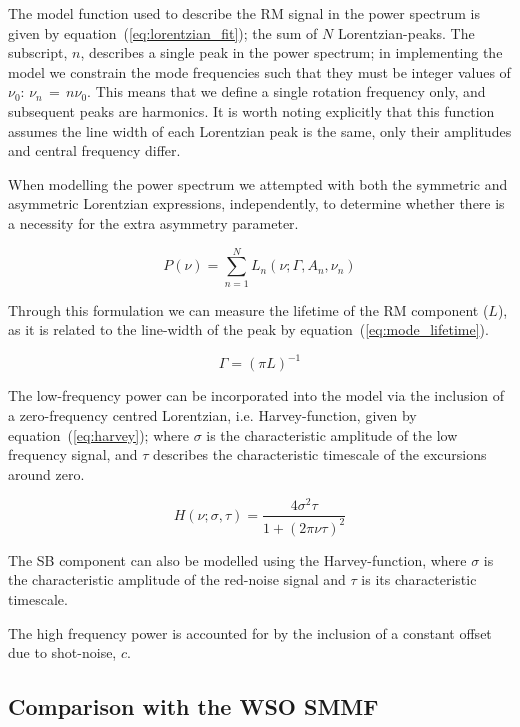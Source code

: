 The model function used to describe the RM signal in the power spectrum is given by equation~(\ref{eq:lorentzian_fit}); the sum of $N$ Lorentzian-peaks. The subscript, $n$, describes a single peak in the power spectrum; in implementing the model we constrain the mode frequencies such that they must be integer values of $\nu_0$: $\nu_n \, = \, n \nu_0$. This means that we define a single rotation frequency only, and subsequent peaks are harmonics. It is worth noting explicitly that this function assumes the line width of each Lorentzian peak is the same, only their amplitudes and central frequency differ.

When modelling the power spectrum we attempted with both the symmetric and asymmetric Lorentzian expressions, independently, to determine whether there is a necessity for the extra asymmetry parameter.

\begin{equation}
P(\nu) = \sum_{n=1}^{N} L_n(\nu; \Gamma, A_n, \nu_n)
\label{eq:lorentzian_fit}
\end{equation}


Through this formulation we can measure the lifetime of the RM component ($L$), as it is related to the line-width of the peak by equation~(\ref{eq:mode_lifetime}).

\begin{equation}
\Gamma  = (\pi L)^{-1}
\label{eq:mode_lifetime}
\end{equation}


The low-frequency power can be incorporated into the model via the inclusion of a zero-frequency centred Lorentzian, i.e. Harvey-function, given by equation~(\ref{eq:harvey}); where $\sigma$ is the characteristic amplitude of the low frequency signal, and $\tau$ describes the characteristic timescale of the excursions around zero.

\begin{equation}
H(\nu; \sigma, \tau) = \frac{4{\sigma}^2\tau}{1 + (2\pi \nu\tau)^2}
\label{eq:harvey}
\end{equation}

The SB component can also be modelled using the Harvey-function, where $\sigma$ is the characteristic amplitude of the red-noise signal and $\tau$ is its characteristic timescale.

The high frequency power is accounted for by the inclusion of a constant offset due to shot-noise, $c$.


\subsection{Comparison with the WSO SMMF}

